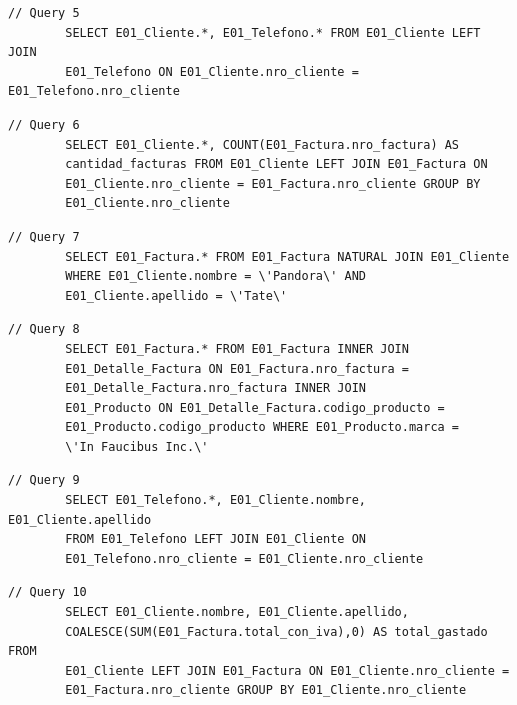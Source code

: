 \documentclass[a4paper,12pt]{article}
\begin{document}
	\bigskip

	\begin{lstlisting}[frame=single, tabsize=1]
		// Query 5
		SELECT E01_Cliente.*, E01_Telefono.* FROM E01_Cliente LEFT JOIN
		E01_Telefono ON E01_Cliente.nro_cliente = E01_Telefono.nro_cliente
	\end{lstlisting}

	\bigskip

	\begin{lstlisting}[frame=single, tabsize=1]
		// Query 6
		SELECT E01_Cliente.*, COUNT(E01_Factura.nro_factura) AS
		cantidad_facturas FROM E01_Cliente LEFT JOIN E01_Factura ON
		E01_Cliente.nro_cliente = E01_Factura.nro_cliente GROUP BY
		E01_Cliente.nro_cliente
	\end{lstlisting}

	\newpage
	
	\begin{lstlisting}[frame=single, tabsize=1]
		// Query 7
		SELECT E01_Factura.* FROM E01_Factura NATURAL JOIN E01_Cliente 
		WHERE E01_Cliente.nombre = \'Pandora\' AND 
		E01_Cliente.apellido = \'Tate\'
	\end{lstlisting}

	\bigskip

	\begin{lstlisting}[frame=single, tabsize=1]
		// Query 8
		SELECT E01_Factura.* FROM E01_Factura INNER JOIN 
		E01_Detalle_Factura ON E01_Factura.nro_factura =
		E01_Detalle_Factura.nro_factura INNER JOIN
		E01_Producto ON E01_Detalle_Factura.codigo_producto =
		E01_Producto.codigo_producto WHERE E01_Producto.marca = 
		\'In Faucibus Inc.\'
	\end{lstlisting}

	\bigskip

	\begin{lstlisting}[frame=single, tabsize=1]
		// Query 9
		SELECT E01_Telefono.*, E01_Cliente.nombre, E01_Cliente.apellido 
		FROM E01_Telefono LEFT JOIN E01_Cliente ON 
		E01_Telefono.nro_cliente = E01_Cliente.nro_cliente
	\end{lstlisting}

	\bigskip

	\begin{lstlisting}[frame=single, tabsize=1]
		// Query 10
		SELECT E01_Cliente.nombre, E01_Cliente.apellido,
		COALESCE(SUM(E01_Factura.total_con_iva),0) AS total_gastado FROM
		E01_Cliente LEFT JOIN E01_Factura ON E01_Cliente.nro_cliente =
		E01_Factura.nro_cliente GROUP BY E01_Cliente.nro_cliente
	\end{lstlisting}
\end{document}
